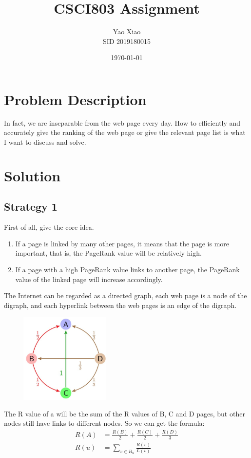 \documentclass{article}
\title{CSCI803 Assignment}
\author{Yao Xiao \\ SID 2019180015}
\date{\today}
\begin{document}
\maketitle

\section{Problem Description}
In fact, we are inseparable from the web page every day. How to efficiently and accurately give the ranking of the web page or give the relevant page list is what I want to discuss and solve.

\section{Solution}
\subsection{Strategy 1} 
First of all, give the core idea.

\begin{enumerate}
    \item If a page is linked by many other pages, it means that the page is more important, that is, the PageRank value will be relatively high.
    \item If a page with a high PageRank value links to another page, the PageRank value of the linked page will increase accordingly.
\end{enumerate}

The Internet can be regarded as a directed graph, each web page is a node of the digraph, and each hyperlink between the web pages is an edge of the digraph.

\begin{figure}[H]
    \centering
    \includegraphics[width=0.4\textwidth]{Fig1}
\end{figure}

The R value of a will be the sum of the R values of B, C and D pages, but other nodes still have links to different nodes. So we can get the formula:
\begin{equation}
    \begin{aligned}
        R(A) &= \frac{R(B)}{2} + \frac{R(C)}{2} + \frac{R(D)}{3}\\
        R(u) &= \sum_{v\in B_{u}} \frac{R(v)}{L(v)}
    \end{aligned}
\end{equation}
\end{document}
